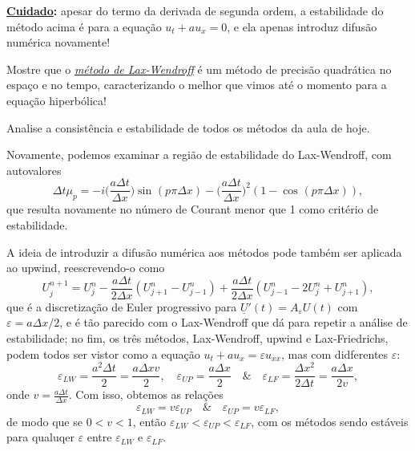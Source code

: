 \documentclass[../differential_methods.tex]{subfiles}
\begin{document}
\textbf{\underline{Cuidado}:} apesar do termo da derivada de segunda ordem, a estabilidade do método acima é para a equação \(u_t + au_x = 0\), e ela apenas introduz difusão numérica novamente!
\begin{exr}
	Mostre que o \hyperlink{lax_wendroff}{\textit{método de Lax-Wendroff}} é um método de precisão quadrática no espaço e no tempo, caracterizando o melhor que vimos até o momento para a equação hiperbólica!

	Analise a consistência e estabilidade de todos os métodos da aula de hoje.
\end{exr}
Novamente, podemos examinar a região de estabilidade do Lax-Wendroff, com autovalores
\[
	\Delta t \mu_p = -i \biggl(\frac{a\Delta t}{\Delta x}\biggr)\sin^{}{(p\pi \Delta x)} - \biggl(\frac{a\Delta t}{\Delta x}\biggr)^{2}(1-\cos^{}{(p\pi \Delta x)}),
\]
que resulta novamente no número de Courant menor que 1 como critério de estabilidade.

A ideia de introduzir a difusão numérica aos métodos pode também ser aplicada ao upwind, reescrevendo-o como
\[
	U_{j}^{n+1} = U_{j}^{n} - \frac{a\Delta t}{2\Delta x}(U_{j+1}^{n} - U_{j-1}^{n}) + \frac{a\Delta t}{2\Delta x} (U_{j-1}^{n} - 2 U_{j}^{n} + U_{j+1}^{n}),
\]
que é a discretização de Euler progressivo para \(\underline{U}'(t) = A_{\varepsilon }U(t)\) com \(\varepsilon  = a\Delta x/2\), e é tão parecido com o Lax-Wendroff que dá para repetir a análise de estabilidade; no fim, os três métodos, Lax-Wendroff, upwind e Lax-Friedrichs, podem todos ser vistor como a equação \(u_t + au_x = \varepsilon u_{xx}\), mas com didferentes \(\varepsilon \):
\[
	\varepsilon_{LW} = \frac{a^{2}\Delta t}{2} = \frac{a\Delta x v}{2}, \quad \varepsilon_{UP} = \frac{a\Delta x}{2} \quad\&\quad \varepsilon_{LF} = \frac{\Delta x^{2}}{2\Delta t} = \frac{a\Delta x}{2v},
\]
onde \(v = \frac{a\Delta t}{\Delta x}\). Com isso, obtemos as relações
\[
	\varepsilon_{LW} = v \varepsilon_{UP} \quad\&\quad \varepsilon_{UP} = v\varepsilon_{LF},
\]
de modo que se \(0 < v < 1\), então \(\varepsilon_{LW} < \varepsilon_{UP} < \varepsilon_{LF}\), com os métodos sendo estáveis para qualuqer \(\varepsilon \) entre \(\varepsilon_{LW}\) e \(\varepsilon_{LF}.\)
\end{document}
